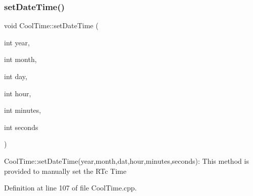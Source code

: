 \subsubsection{\texorpdfstring{set\+Date\+Time()}{setDateTime()}}
{\footnotesize\ttfamily void Cool\+Time\+::set\+Date\+Time (\begin{DoxyParamCaption}\item[{int}]{year,  }\item[{int}]{month,  }\item[{int}]{day,  }\item[{int}]{hour,  }\item[{int}]{minutes,  }\item[{int}]{seconds }\end{DoxyParamCaption})}

Cool\+Time\+::set\+Date\+Time(year,month,dat,hour,minutes,seconds)\+: This method is provided to manually set the R\+Tc Time 

Definition at line 107 of file Cool\+Time.\+cpp.


